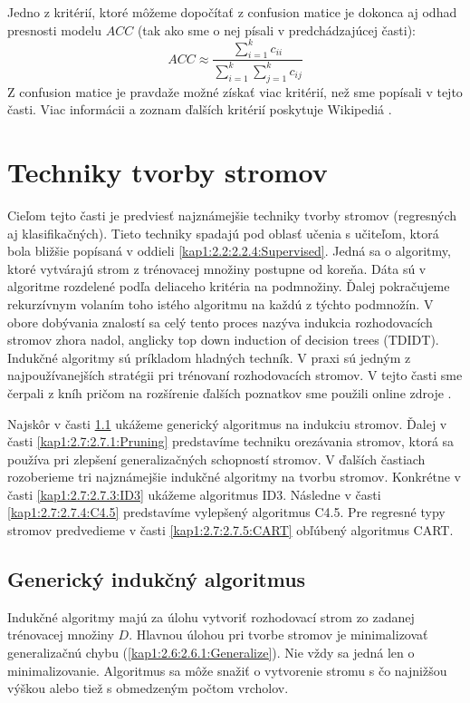 Jedno z kritérií, ktoré môžeme dopočítať z confusion matice je dokonca aj odhad presnosti modelu $ACC$ (tak ako sme o nej písali v predchádzajúcej časti):
\begin{equation}
ACC \approx \dfrac{\sum_{i=1}^{k} c_{ii}}{\sum_{i=1}^{k}\sum_{j=1}^{k} c_{ij}} \nonumber
\end{equation}
Z confusion matice je pravdaže možné získať viac kritérií, než sme popísali v tejto časti. Viac informácii a zoznam ďalších kritérií poskytuje Wikipediá \cite{wiki-Confusion}.

\section{Techniky tvorby stromov}\label{kap1:2.7:DTTechniques}
Cieľom tejto časti je predviesť najznámejšie techniky tvorby stromov (regresných aj klasifikačných). Tieto techniky spadajú pod oblasť učenia s učiteľom, ktorá bola bližšie popísaná v oddieli \ref{kap1:2.2:2.2.4:Supervised}. Jedná sa o algoritmy, ktoré vytvárajú strom z trénovacej množiny postupne od koreňa. Dáta sú v algoritme rozdelené podľa deliaceho kritéria na podmnožiny. Ďalej pokračujeme rekurzívnym volaním toho istého algoritmu na každú z týchto podmnožín. V obore dobývania znalostí sa celý tento proces nazýva indukcia rozhodovacích stromov zhora nadol, anglicky top down induction of decision trees (TDIDT). Indukčné algoritmy sú príkladom hladných techník. V praxi sú jedným z najpoužívanejších stratégii pri trénovaní rozhodovacích stromov. V tejto časti sme čerpali z kníh \cite{kap1-DataMiningForTrees,kap1-DataMiningAndAnalysis} pričom na rozšírenie ďalších poznatkov sme použili online zdroje \cite{online-SplitCriterias,online-SplitCriteriasMatter,online-DTLectures}.

Najskôr v časti \ref{kap1:2.7:2.7.2:Generic} ukážeme generický algoritmus na indukciu stromov. Ďalej v časti \ref{kap1:2.7:2.7.1:Pruning} predstavíme techniku orezávania stromov, ktorá sa používa pri zlepšení generalizačných schopností stromov.  V ďalších častiach rozoberieme tri najznámejšie indukčné algoritmy na tvorbu stromov. Konkrétne v časti \ref{kap1:2.7:2.7.3:ID3} ukážeme algoritmus ID3. Následne v časti \ref{kap1:2.7:2.7.4:C4.5} predstavíme vylepšený algoritmus C4.5. Pre regresné typy stromov predvedieme v časti \ref{kap1:2.7:2.7.5:CART} obľúbený algoritmus CART.

\subsection{Generický indukčný algoritmus}\label{kap1:2.7:2.7.2:Generic}
Indukčné algoritmy majú za úlohu vytvoriť rozhodovací strom zo zadanej trénovacej množiny $D$. Hlavnou úlohou pri tvorbe stromov je minimalizovať generalizačnú chybu (\ref{kap1:2.6:2.6.1:Generalize}). Nie vždy sa jedná len o minimalizovanie. Algoritmus sa môže snažiť o vytvorenie stromu s čo najnižšou výškou alebo tiež s obmedzeným počtom vrcholov.

